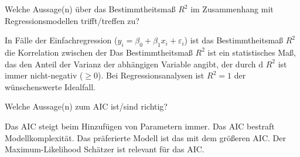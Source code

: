 \documentclass[10pt,addpoints]{exam}
\begin{document}
\begin{questions}
\question Welche Aussage(n) über das Bestimmtheitsmaß \( R^2 \) im Zusammenhang mit Regressionsmodellen trifft/treffen zu?

\begin{choices}
\choice In Fälle der Einfachregression (\( y_i = \beta_0 + \beta_1x_i + \varepsilon_i \)) ist das Bestimmtheitsmaß \( R^2 \) die Korrelation zwischen der
\CorrectChoice Das Bestimmtheitsmaß \( R^2 \) ist ein statistisches Maß, das den Anteil der Varianz der abhängigen Variable angibt, der durch d
\CorrectChoice \( R^2 \) ist immer nicht-negativ (\( \geq 0 \)).
\choice Bei Regressionsanalysen ist \( R^2 = 1 \) der wünschenswerte Idealfall.
\end{choices}

\question Welche Aussage(n) zum AIC ist/sind richtig?

\begin{choices}
\choice Das AIC steigt beim Hinzufügen von Parametern immer.
\CorrectChoice Das AIC bestraft Modellkomplexität.
\choice Das präferierte Modell ist das mit dem größeren AIC.
\CorrectChoice Der Maximum-Likelihood Schätzer ist relevant für das AIC.
\end{choices}


\printanswers
\end{questions}
\end{document}
